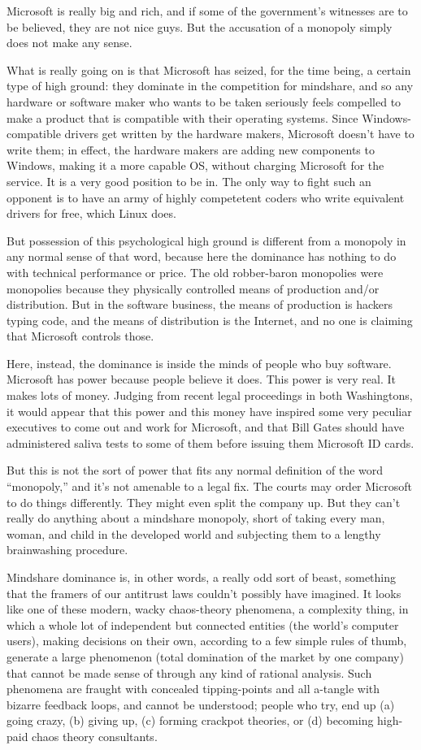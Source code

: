 \documentclass[
  fontsize=11pt,
  paper=landscape,
  twocolumn=true,
  pagesize=pdftex,
  headings=small,
  DIV=15,
  ]{scrartcl}
\begin{document}
Microsoft is really big and rich, and if some of the government's
witnesses are to be believed, they are not nice guys. But the accusation
of a monopoly simply does not make any sense.

What is really going on is that Microsoft has seized, for the time
being, a certain type of high ground: they dominate in the competition
for mindshare, and so any hardware or software maker who wants to be
taken seriously feels compelled to make a product that is compatible
with their operating systems. Since Windows-compatible drivers get
written by the hardware makers, Microsoft doesn't have to write them; in
effect, the hardware makers are adding new components to Windows, making
it a more capable OS, without charging Microsoft for the service. It is
a very good position to be in. The only way to fight such an opponent is
to have an army of highly competetent coders who write equivalent
drivers for free, which Linux does.

But possession of this psychological high ground is different from a
monopoly in any normal sense of that word, because here the dominance
has nothing to do with technical performance or price. The old
robber-baron monopolies were monopolies because they physically
controlled means of production and/or distribution. But in the software
business, the means of production is hackers typing code, and the means
of distribution is the Internet, and no one is claiming that Microsoft
controls those.

Here, instead, the dominance is inside the minds of people who buy
software. Microsoft has power because people believe it does. This power
is very real. It makes lots of money. Judging from recent legal
proceedings in both Washingtons, it would appear that this power and
this money have inspired some very peculiar executives to come out and
work for Microsoft, and that Bill Gates should have administered saliva
tests to some of them before issuing them Microsoft ID cards.

But this is not the sort of power that fits any normal definition of the
word ``monopoly,'' and it's not amenable to a legal fix. The courts may
order Microsoft to do things differently. They might even split the
company up. But they can't really do anything about a mindshare
monopoly, short of taking every man, woman, and child in the developed
world and subjecting them to a lengthy brainwashing procedure.

Mindshare dominance is, in other words, a really odd sort of beast,
something that the framers of our antitrust laws couldn't possibly have
imagined. It looks like one of these modern, wacky chaos-theory
phenomena, a complexity thing, in which a whole lot of independent but
connected entities (the world's computer users), making decisions on
their own, according to a few simple rules of thumb, generate a large
phenomenon (total domination of the market by one company) that cannot
be made sense of through any kind of rational analysis. Such phenomena
are fraught with concealed tipping-points and all a-tangle with bizarre
feedback loops, and cannot be understood; people who try, end up (a)
going crazy, (b) giving up, (c) forming crackpot theories, or (d)
becoming high-paid chaos theory consultants.
\end{document}
